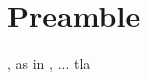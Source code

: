 \chapter*{Preamble}



\lipsum[7-7], as in \cite{borjas1991immigration}, ...  \Gls{tla}


\newpage

